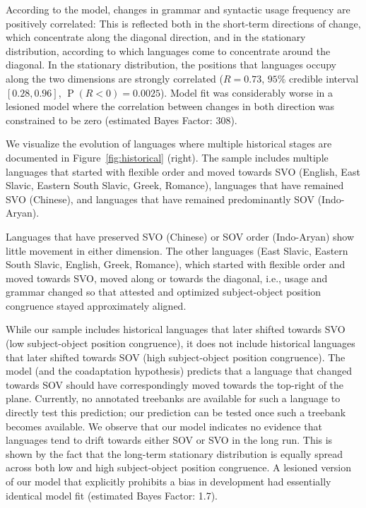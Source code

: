 \documentclass[9pt,twocolumn,twoside,lineno]{pnas-new}
\begin{document}
According to the model, changes in grammar and syntactic usage frequency are positively correlated:
This is reflected both in the short-term directions of change, which concentrate along the diagonal direction, and in the stationary distribution, according to which languages come to concentrate around the diagonal.
In the stationary distribution, the positions that languages occupy along the two dimensions are strongly correlated ($R=0.73$, $95\%$ credible interval $[0.28, 0.96]$, $\operatorname{P}(R<0) = 0.0025$). %
Model fit was considerably worse in a lesioned model where the correlation between changes in both direction was constrained to be zero (estimated Bayes Factor: 308). %



We visualize the evolution of languages where multiple historical stages are documented in Figure~\ref{fig:historical} (right).
The sample includes multiple languages that started with flexible order and moved towards SVO (English, East Slavic, Eastern South Slavic, Greek, Romance), languages that have remained SVO (Chinese), and languages that have remained predominantly SOV (Indo-Aryan).

Languages that have preserved SVO (Chinese) or SOV order (Indo-Aryan) show little movement in either dimension.
The other languages (East Slavic, Eastern South Slavic, English, Greek, Romance), which started with flexible order and moved towards SVO, moved along or towards the diagonal, i.e., usage and grammar changed so that attested and optimized subject-object position congruence stayed approximately aligned.


While our sample includes historical languages that later shifted towards SVO (low subject-object position congruence), it does not include historical languages that later shifted towards SOV (high subject-object position congruence).
The model (and the coadaptation hypothesis) predicts that a language that changed towards SOV should have correspondingly moved towards the top-right of the plane. 
Currently, no annotated treebanks are available for such a language to directly test this prediction; our prediction can be tested once such a treebank becomes available.
We observe that our model indicates no evidence that languages tend to drift towards either SOV or SVO in the long run.
This is shown by the fact that the long-term stationary distribution is equally spread across both low and high subject-object position congruence.
A lesioned version of our model that explicitly prohibits a bias in development had essentially identical model fit (estimated Bayes Factor: 1.7). %
\end{document}
